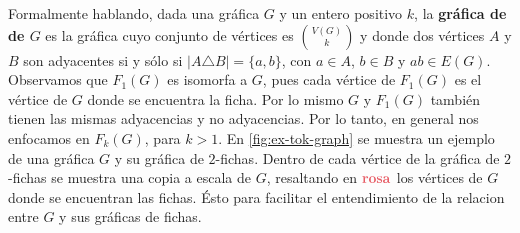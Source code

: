 Formalmente hablando, dada una gr\'afica $G$ y un entero positivo $k$, la
\textbf{gr\'afica de}  \textbf{de
$G$} es la gr\'afica cuyo conjunto de v\'ertices es
$\binom{V(G)}{k}$ y donde dos v\'ertices $A$ y $B$ son adyacentes si y s\'olo si
$|A \triangle B| = \{a,b\}$, con $a \in A$, $b \in B$ y $ab \in E(G)$.
Observamos que $F_1(G)$ es isomorfa a $G$, pues cada v\'ertice de $F_1(G)$ es el
v\'ertice de $G$ donde se encuentra la ficha. Por lo mismo $G$ y $F_1(G)$
tambi\'en tienen las mismas adyacencias y no adyacencias. Por lo tanto, en
general nos enfocamos en $F_k(G)$, para $k > 1$. En \cref{fig:ex-tok-graph} se
muestra un ejemplo de una gr\'afica $G$ y su gr\'afica de $2$-fichas. Dentro de
cada v\'ertice de la gr\'afica de $2$-fichas se muestra una copia a escala de
$G$, resaltando en ${\color{rosa}\bf rosa}$ los v\'ertices de $G$ donde se
encuentran las fichas. \'Esto para facilitar el entendimiento de la relacion
entre $G$ y sus gr\'aficas de fichas.

